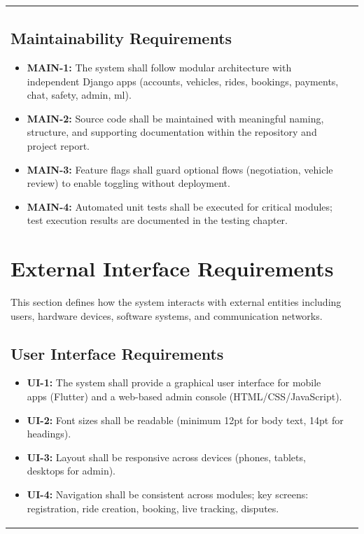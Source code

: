 \begin{longtable}{|>{\raggedright\arraybackslash}p{4cm}|>{\raggedright\arraybackslash}p{11cm}|}
\subsection{Maintainability Requirements}
\begin{itemize}
\item \textbf{MAIN-1:} The system shall follow modular architecture with independent Django apps (accounts, vehicles, rides, bookings, payments, chat, safety, admin, ml).
\item \textbf{MAIN-2:} Source code shall be maintained with meaningful naming, structure, and supporting documentation within the repository and project report.
\item \textbf{MAIN-3:} Feature flags shall guard optional flows (negotiation, vehicle review) to enable toggling without deployment.
\item \textbf{MAIN-4:} Automated unit tests shall be executed for critical modules; test execution results are documented in the testing chapter.
\end{itemize}

\section{External Interface Requirements}

This section defines how the system interacts with external entities including users, hardware devices, software systems, and communication networks.

\subsection{User Interface Requirements}
\begin{itemize}
\item \textbf{UI-1:} The system shall provide a graphical user interface for mobile apps (Flutter) and a web-based admin console (HTML/CSS/JavaScript).
\item \textbf{UI-2:} Font sizes shall be readable (minimum 12pt for body text, 14pt for headings).
\item \textbf{UI-3:} Layout shall be responsive across devices (phones, tablets, desktops for admin).
\item \textbf{UI-4:} Navigation shall be consistent across modules; key screens: registration, ride creation, booking, live tracking, disputes.
\end{itemize}


\end{longtable}
